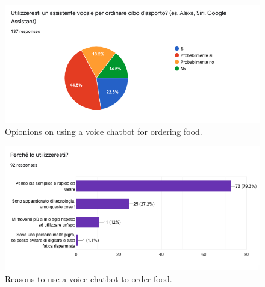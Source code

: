 \begin{figure}[h]
    \centering
    \includegraphics[scale=0.5]{images/q_v.png}
    \caption{Opionions on using a voice chatbot for ordering food.}
    \label{fig:q_v}
\end{figure}

\begin{figure}[h]
    \centering
    \includegraphics[scale=0.5]{images/q_r2.png}
    \caption{Reasons to use a voice chatbot to order food.}
    \label{fig:q_r2}
\end{figure}